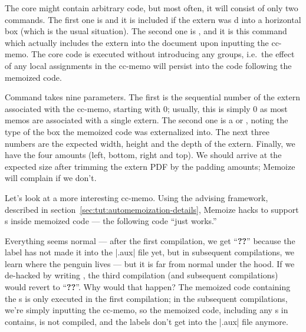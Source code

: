 \documentclass[a4paper,11pt]{article}
\begin{document}
The core might contain arbitrary code, but most often, it will consist of only
two commands.  The first one is  and it is included if the
extern was d into a horizontal box (which is the usual
situation).  The second one is , and it is this
command which actually includes the extern into the document upon inputting the
cc-memo. The core code is executed without introducing any groups, i.e.\ the
effect of any local assignments in the cc-memo will persist into the code
following the memoized code.

Command  takes nine parameters.  The first is the
sequential number of the extern associated with the cc-memo, starting with 0;
usually, this is simply 0 as most memos are associated with a single extern.
The second one is a  or , noting the type of the box
the memoized code was externalized into.  The next three numbers are the
expected width, height and the depth of the extern.  Finally, we have the four
 amounts (left, bottom, right and top).  We should arrive at
the expected size after trimming the extern PDF by the
padding amounts; Memoize will complain if we don't.

Let's look at a more interesting cc-memo.  Using the advising framework,
described in section~\ref{sec:tut:automemoization-details}, Memoize hacks
 to support s inside memoized code --- the following
code ``just works.''


Everything seems normal --- after the first compilation, we get ``\textbf{??}''
because the label has not made it into the |.aux| file yet, but in subsequent
compilations, we learn where the penguin lives --- but it is far from normal
under the hood. If we de-hacked  by writing
, the third compilation
(and subsequent compilations) would revert to ``\textbf{??}''.  Why would that
happen?  The memoized code containing the s is only executed in the
first compilation; in the subsequent compilations, we're simply inputting the
cc-memo, so the memoized code, including any s in contains, is not
compiled, and the labels don't get into the |.aux| file anymore.
\end{document}
